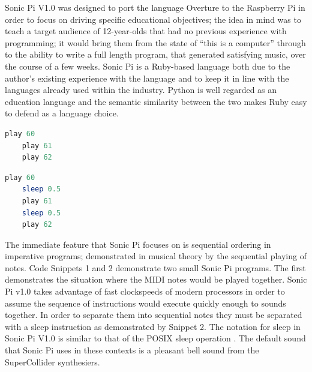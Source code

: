 \documentclass[11pt]{scrartcl}
\begin{document}
\begin{multicols}{2}
Sonic Pi V1.0 was designed to port the language Overture to the Raspberry Pi in 
order to focus on driving specific educational objectives; the idea in mind was 
to teach a target audience of 12-year-olds that had no previous experience with 
programming; it would bring them from the state of ``this is a computer'' through 
to the ability to write a full length program, that generated satisfying music, 
over the course of a few weeks. Sonic Pi is a Ruby-based language both due to 
the author's existing experience with the language and to keep it in line with 
the languages already used within the industry. Python is well regarded as an 
education language and the semantic similarity between the two makes Ruby easy 
to defend as a language choice.
\\

\begin{minipage}{0.5\textwidth}
	\begin{minipage}[t]{\textwidth}
		\begin{lstlisting}[language = ruby]
	play 60
	play 61
	play 62
		\end{lstlisting}
	\end{minipage}

	\begin{minipage}[t]{\textwidth}
		\begin{lstlisting}[language = ruby]
	play 60
	sleep 0.5
	play 61
	sleep 0.5
	play 62
		\end{lstlisting}
	\end{minipage}
\end{minipage}

\end{multicols}

The immediate feature that Sonic Pi focuses on is sequential ordering in 
imperative programs; demonstrated in musical theory by the sequential playing 
of notes. Code Snippets 1 and 2 demonstrate two small Sonic Pi programs. The 
first demonstrates the situation where the MIDI notes would be played together. 
Sonic Pi v1.0 takes advantage of fast clockspeeds of modern processors in order 
to assume the sequence of instructions would execute quickly enough 
to sounds together. In order to separate them into sequential notes they must 
be separated with a sleep instruction as demonstrated by Snippet 2. The notation 
for sleep in Sonic Pi V1.0 is similar to that of the POSIX sleep operation 
\cite{IG13}. The default sound that Sonic Pi uses in these contexts is a 
pleasant bell sound from the SuperCollider synthesiers.
\end{document}

